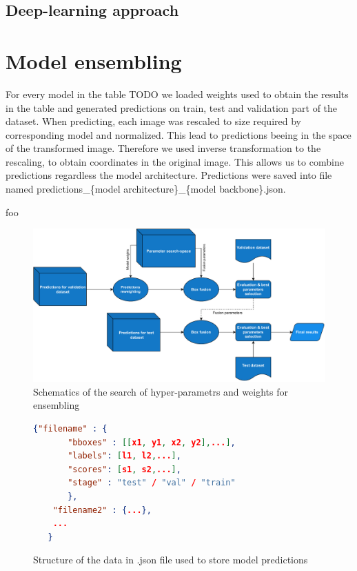 \subsection{Deep-learning approach}



\section{Model ensembling}

For every model in the table TODO we loaded weights used to obtain the results in the table and generated predictions on train, test and validation part of the dataset. When predicting, each image was rescaled to size required by corresponding model and normalized. This lead to predictions beeing in the space of the transformed image. Therefore we used inverse transformation to the rescaling, to obtain coordinates in the original image. This allows us to combine predictions regardless the model architecture.
Predictions were saved into file named predictions\_\{model architecture\}\_\{model backbone\}.json.

foo
\begin{figure}
    \centering
    \includegraphics[width=\linewidth]{images/ensemble_search_diag.drawio.pdf}
    \caption{Schematics of the search of hyper-parametrs and weights for ensembling}
    \label{fig:diag:ense_search}
\end{figure}

\begin{figure}
    \centering
    \begin{lstlisting}[language=json, numbers=none]
   {"filename" : {
       "bboxes" : [[x1, y1, x2, y2],...],
       "labels": [l1, l2,...],
       "scores": [s1, s2,...],
       "stage" : "test" / "val" / "train"
       },
    "filename2" : {...},
    ...
   }
\end{lstlisting}
    \caption{Structure of the data in .json file used to store model predictions}
    \label{fig:predictions_json}
\end{figure}